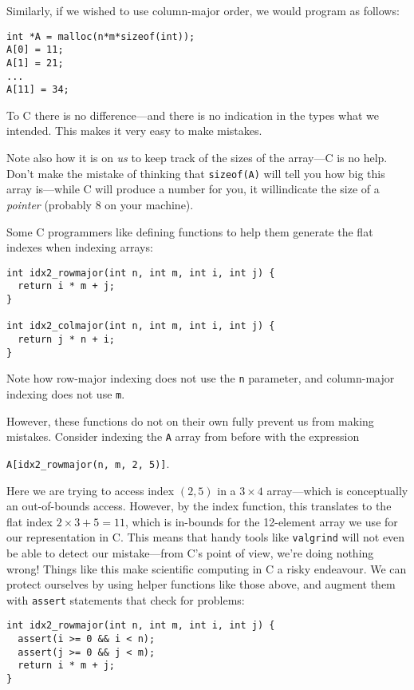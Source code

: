 Similarly, if we wished to use column-major order, we would program as
follows:

\begin{lstlisting}
int *A = malloc(n*m*sizeof(int));
A[0] = 11;
A[1] = 21;
...
A[11] = 34;
\end{lstlisting}

To C there is no difference---and there is no indication in the types
what we intended.  This makes it very easy to make mistakes.

Note also how it is on \textit{us} to keep track of the sizes of the
array---C is no help.  Don't make the mistake of thinking that
\lstinline{sizeof(A)} will tell you how big this array is---while C
will produce a number for you, it willindicate the size of a
\textit{pointer} (probably 8 on your machine).

Some C programmers like defining functions to help them generate the
flat indexes when indexing arrays:

\begin{lstlisting}
int idx2_rowmajor(int n, int m, int i, int j) {
  return i * m + j;
}

int idx2_colmajor(int n, int m, int i, int j) {
  return j * n + i;
}
\end{lstlisting}

Note how row-major indexing does not use the \texttt{n} parameter, and
column-major indexing does not use \texttt{m}.

However, these functions do not on their own fully prevent us from
making mistakes.  Consider indexing the \texttt{A} array from before
with the expression

\begin{center}
\lstinline{A[idx2_rowmajor(n, m, 2, 5)]}.
\end{center}

Here we are trying to access index $(2,5)$ in a $3\times{}4$
array---which is conceptually an out-of-bounds access.  However, by
the index function, this translates to the flat index
$2\times{}3+5=11$, which is in-bounds for the 12-element array we use
for our representation in C.  This means that handy tools like
\texttt{valgrind} will not even be able to detect our mistake---from
C's point of view, we're doing nothing wrong!  Things like this make
scientific computing in C a risky endeavour.  We can protect ourselves
by using helper functions like those above, and augment them with
\texttt{assert} statements that check for problems:

\begin{lstlisting}
int idx2_rowmajor(int n, int m, int i, int j) {
  assert(i >= 0 && i < n);
  assert(j >= 0 && j < m);
  return i * m + j;
}
\end{lstlisting}


